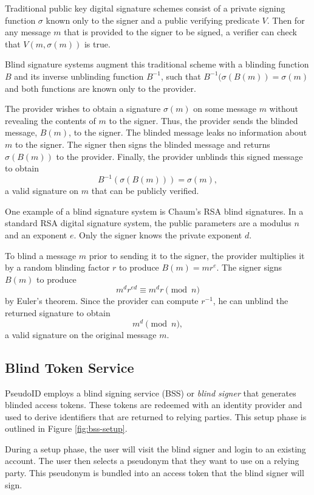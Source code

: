 \documentclass{llncs}
\begin{document}
Traditional public key digital signature schemes \cite{DH76} consist of a
private signing function $\sigma$ known only to the signer and a public verifying predicate $V$. Then for any message $m$ that is provided to the signer to be signed, a verifier can check that $V(m, \sigma(m))$ is true.

Blind signature systems \cite{Cha82} augment this traditional scheme with a
blinding function $B$ and its inverse unblinding function $B^{-1}$, such that
$B^{-1}(\sigma(B(m)) = \sigma(m)$ and both functions are known only to the
provider.

The provider wishes to obtain a signature $\sigma(m)$ on some message $m$ without revealing the contents of $m$ to the signer. Thus, the provider sends the blinded message, $B(m)$, to the signer. The blinded message leaks no information about $m$ to the signer. The signer then signs the blinded message and returns $\sigma(B(m))$ to the provider. Finally, the provider unblinds this signed message to obtain $$B^{-1}(\sigma(B(m))) = \sigma(m),$$
a valid signature on $m$ that can be publicly verified.

One example of a blind signature system is Chaum's RSA blind signatures. In a
standard RSA digital signature system, the public parameters are a modulus $n$
and an exponent $e$. Only the signer knows the private exponent $d$.

To blind a message $m$ prior to sending it to the signer, the provider multiplies it by a random blinding factor $r$ to produce $B(m) = mr^e$. The signer signs $B(m)$ to produce $$m^d r^{ed} \equiv m^d r \pmod n$$ by Euler's theorem. Since the provider can compute $r^{-1}$, he can unblind the returned signature to obtain $$m^d \pmod n,$$ a valid signature on the original message $m$.


\subsection{Blind Token Service}

PseudoID employs a blind signing service (BSS) or \textit{blind signer} that generates blinded access tokens. These tokens are redeemed with an identity provider and used to derive identifiers that are returned to relying parties. This setup phase is outlined in Figure \ref{fig:bss-setup}.

During a setup phase, the user will visit the blind signer and login to an existing account. The user then selects a pseudonym that they want to use on a relying party. This pseudonym is bundled into an access token that the blind signer will sign.
\end{document}

